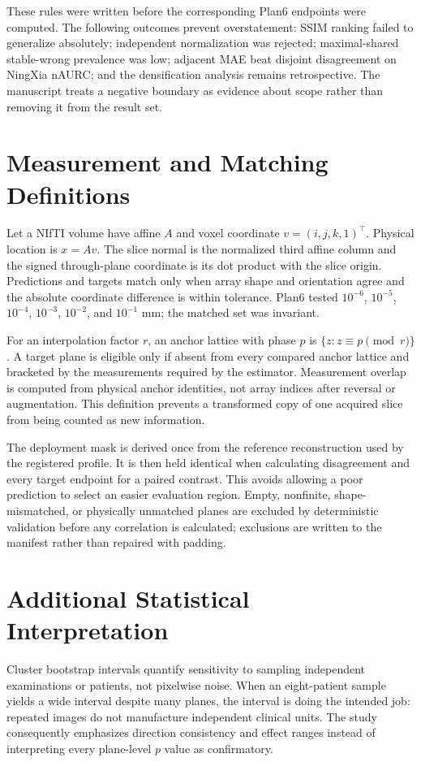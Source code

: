 \documentclass[journal,10pt]{IEEEtran}
\begin{document}
These rules were written before the corresponding Plan6 endpoints were computed. The following outcomes prevent overstatement: SSIM ranking failed to generalize absolutely; independent normalization was rejected; maximal-shared stable-wrong prevalence was low; adjacent MAE beat disjoint disagreement on NingXia nAURC; and the densification analysis remains retrospective. The manuscript treats a negative boundary as evidence about scope rather than removing it from the result set.

\section{Measurement and Matching Definitions}
Let a NIfTI volume have affine $A$ and voxel coordinate $v=(i,j,k,1)^\top$. Physical location is $x=Av$. The slice normal is the normalized third affine column and the signed through-plane coordinate is its dot product with the slice origin. Predictions and targets match only when array shape and orientation agree and the absolute coordinate difference is within tolerance. Plan6 tested $10^{-6}$, $10^{-5}$, $10^{-4}$, $10^{-3}$, $10^{-2}$, and $10^{-1}$ mm; the matched set was invariant.

For an interpolation factor $r$, an anchor lattice with phase $p$ is $\{z:z\equiv p\pmod r\}$. A target plane is eligible only if absent from every compared anchor lattice and bracketed by the measurements required by the estimator. Measurement overlap is computed from physical anchor identities, not array indices after reversal or augmentation. This definition prevents a transformed copy of one acquired slice from being counted as new information.

The deployment mask is derived once from the reference reconstruction used by the registered profile. It is then held identical when calculating disagreement and every target endpoint for a paired contrast. This avoids allowing a poor prediction to select an easier evaluation region. Empty, nonfinite, shape-mismatched, or physically unmatched planes are excluded by deterministic validation before any correlation is calculated; exclusions are written to the manifest rather than repaired with padding.

\section{Additional Statistical Interpretation}
Cluster bootstrap intervals quantify sensitivity to sampling independent examinations or patients, not pixelwise noise. When an eight-patient sample yields a wide interval despite many planes, the interval is doing the intended job: repeated images do not manufacture independent clinical units. The study consequently emphasizes direction consistency and effect ranges instead of interpreting every plane-level $p$ value as confirmatory.
\end{document}
